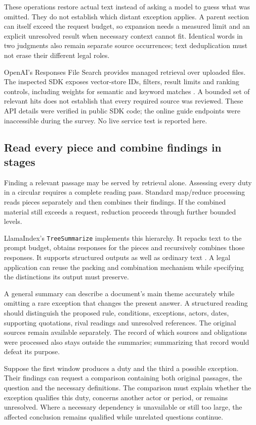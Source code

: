 These operations restore actual text instead of asking a model to guess what
was omitted. They do not establish which distant exception applies. A parent
section can itself exceed the request budget, so expansion needs a measured
limit and an explicit unresolved result when necessary context cannot fit.
Identical words in two judgments also remain separate source occurrences;
text deduplication must not erase their different legal roles.

OpenAI's Responses File Search provides managed retrieval over uploaded
files. The inspected SDK exposes vector-store IDs, filters, result limits
and ranking controls, including weights for semantic and keyword matches
\citep{openaifilesearch2026}. A bounded set of relevant hits does not establish
that every required source was reviewed. These API details were verified in
public SDK code; the online guide endpoints were inaccessible during the
survey. No live service test is reported here.

\subsection{Read every piece and combine findings in stages}

Finding a relevant passage may be served by retrieval alone. Assessing every
duty in a circular requires a complete reading pass. Standard map/reduce
processing reads pieces separately and then combines their findings. If the
combined material still exceeds a request, reduction proceeds through
further bounded levels.

LlamaIndex's \texttt{TreeSummarize} implements this hierarchy. It repacks
text to the prompt budget, obtains responses for the pieces and recursively
combines those responses. It supports structured outputs as well as ordinary
text \citep{llamaindextree2026}. A legal application can reuse the packing
and combination mechanism while specifying the distinctions its output must
preserve.

A general summary can describe a document's main theme accurately while
omitting a rare exception that changes the present answer. A structured
reading should distinguish the proposed rule, conditions, exceptions,
actors, dates, supporting quotations, rival readings and unresolved
references. The original sources remain available separately. The record of
which sources and obligations were processed also stays outside the summaries;
summarizing that record would defeat its purpose.

Suppose the first window produces a duty and the third a possible exception.
Their findings can request a comparison containing both original passages,
the question and the necessary definitions. The comparison must explain
whether the exception qualifies this duty, concerns another actor or period,
or remains unresolved. Where a necessary dependency is unavailable or still
too large, the affected conclusion remains qualified while unrelated questions
continue.

